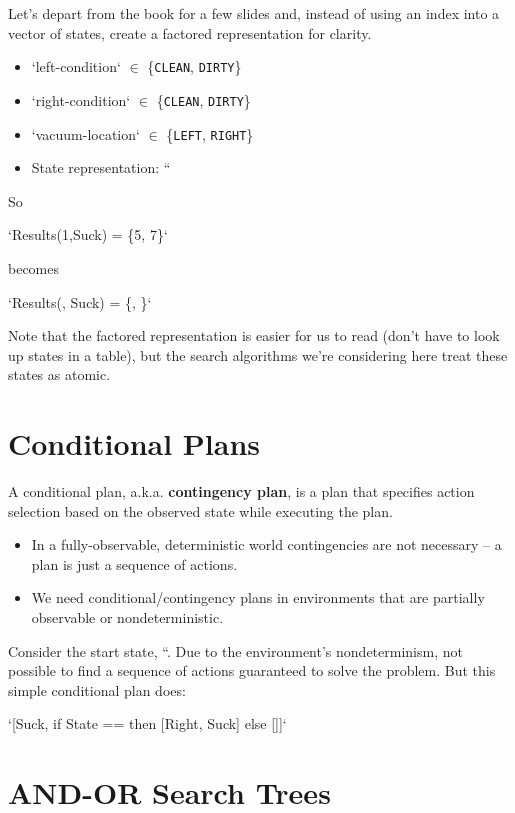 \documentclass[11pt]{article}
\begin{document}
Let's depart from the book for a few slides and, instead of using an index into a vector of states, create a factored representation for clarity.

\begin{itemize}
\item `left-condition` \(\in\) \{\texttt{CLEAN}, \texttt{DIRTY}\}
\item `right-condition` \(\in\) \{\texttt{CLEAN}, \texttt{DIRTY}\}
\item `vacuum-location` \(\in\) \{\texttt{LEFT}, \texttt{RIGHT}\}
\item State representation: ``
\end{itemize}

So


`Results(1,Suck) = \{5, 7\}`

becomes

`Results(, Suck) = \{, \}`


Note that the factored representation is easier for us to read (don't have to look up states in a table), but the search algorithms we're considering here treat these states as atomic.
\section{Conditional Plans}
\label{sec:org7631eef}

A conditional plan, a.k.a. \textbf{contingency plan}, is a plan that specifies action selection based on the observed state while executing the plan.

\begin{itemize}
\item In a fully-observable, deterministic world contingencies are not necessary -- a plan is just a sequence of actions.
\item We need conditional/contingency plans in environments that are partially observable or nondeterministic.
\end{itemize}

Consider the start state, ``.  Due to the environment's nondeterminism, not possible to find a sequence of actions guaranteed to solve the problem.  But this simple conditional plan does:


`[Suck, if State ==  then [Right, Suck] else []]`
\section{AND-OR Search Trees}
\label{sec:orgc63dbfc}
\end{document}
